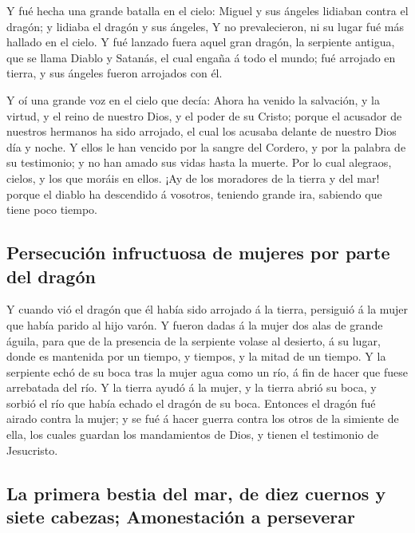  Y fué hecha una grande batalla en el cielo: Miguel y sus
ángeles lidiaban contra el dragón; y lidiaba el dragón y sus ángeles,
 Y no prevalecieron, ni su lugar fué más hallado en el
cielo.  Y fué lanzado fuera aquel gran dragón, la
serpiente antigua, que se llama Diablo y Satanás, el cual engaña á todo
el mundo; fué arrojado en tierra, y sus ángeles fueron arrojados con él.

 Y oí una grande voz en el cielo que decía: Ahora ha
venido la salvación, y la virtud, y el reino de nuestro Dios, y el poder
de su Cristo; porque el acusador de nuestros hermanos ha sido arrojado,
el cual los acusaba delante de nuestro Dios día y noche. 
Y ellos le han vencido por la sangre del Cordero, y por la palabra de su
testimonio; y no han amado sus vidas hasta la muerte. 
Por lo cual alegraos, cielos, y los que moráis en ellos. ¡Ay de los
moradores de la tierra y del mar! porque el diablo ha descendido á
vosotros, teniendo grande ira, sabiendo que tiene poco tiempo.

\hypertarget{persecuciuxf3n-infructuosa-de-mujeres-por-parte-del-draguxf3n}{%
\subsection{Persecución infructuosa de mujeres por parte del
dragón}\label{persecuciuxf3n-infructuosa-de-mujeres-por-parte-del-draguxf3n}}

 Y cuando vió el dragón que él había sido arrojado á la
tierra, persiguió á la mujer que había parido al hijo varón.
 Y fueron dadas á la mujer dos alas de grande águila,
para que de la presencia de la serpiente volase al desierto, á su lugar,
donde es mantenida por un tiempo, y tiempos, y la mitad de un tiempo.
 Y la serpiente echó de su boca tras la mujer agua como
un río, á fin de hacer que fuese arrebatada del río.  Y
la tierra ayudó á la mujer, y la tierra abrió su boca, y sorbió el río
que había echado el dragón de su boca.  Entonces el
dragón fué airado contra la mujer; y se fué á hacer guerra contra los
otros de la simiente de ella, los cuales guardan los mandamientos de
Dios, y tienen el testimonio de Jesucristo.

\hypertarget{la-primera-bestia-del-mar-de-diez-cuernos-y-siete-cabezas-amonestaciuxf3n-a-perseverar}{%
\subsection{La primera bestia del mar, de diez cuernos y siete cabezas;
Amonestación a
perseverar}\label{la-primera-bestia-del-mar-de-diez-cuernos-y-siete-cabezas-amonestaciuxf3n-a-perseverar}}

